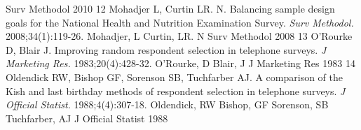 \documentclass{article}
\begin{document}
Surv Methodol%
2010%
12%
Mohadjer L, Curtin LR. N. Balancing sample design goals for the National Health and Nutrition Examination Survey. %
\textit{Surv Methodol. }
2008;34(1):119-26.%
Mohadjer, %
L
Curtin, %
LR. N
Surv Methodol%
2008%
13%
O’Rourke D, Blair J. Improving random respondent selection in telephone surveys. %
\textit{J Marketing Res.}
 1983;20(4):428-32.%
O’Rourke, %
D
Blair, %
J
J Marketing Res%
1983%
14%
Oldendick RW, Bishop GF, Sorenson SB, Tuchfarber AJ. A comparison of the Kish and last birthday methods of respondent selection in telephone surveys. %
\textit{J Official Statist.}
 1988;4(4):307-18.%
Oldendick, %
RW
Bishop, %
GF
Sorenson, %
SB
Tuchfarber, %
AJ
J Official Statist%
1988%
\end{document}
